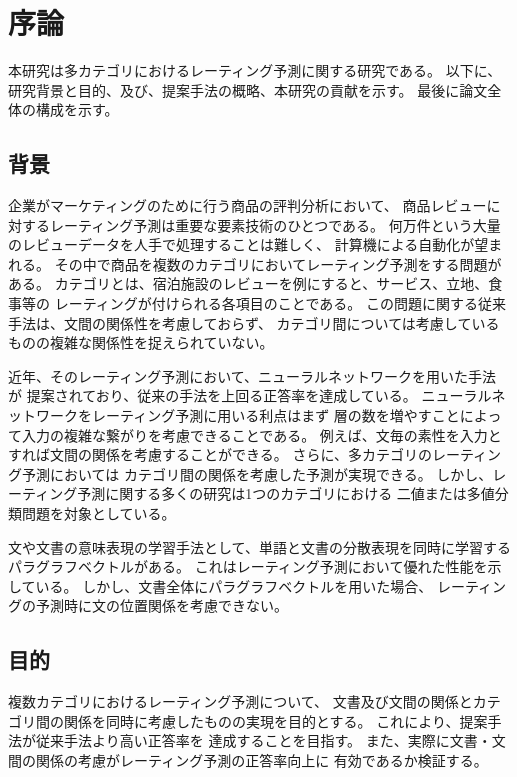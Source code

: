 \section{序論} \label{sec:Introduction}

本研究は多カテゴリにおけるレーティング予測に関する研究である。
以下に、研究背景と目的、及び、提案手法の概略、本研究の貢献を示す。
最後に論文全体の構成を示す。

\subsection{背景}

企業がマーケティングのために行う商品の評判分析において、
商品レビューに対するレーティング予測は重要な要素技術のひとつである。
何万件という大量のレビューデータを人手で処理することは難しく、
計算機による自動化が望まれる。
その中で商品を複数のカテゴリにおいてレーティング予測をする問題がある。
カテゴリとは、宿泊施設のレビューを例にすると、サービス、立地、食事等の
レーティングが付けられる各項目のことである。
この問題に関する従来手法\cite{fujitani15}は、文間の関係性を考慮しておらず、
カテゴリ間については考慮しているものの複雑な関係性を捉えられていない。

近年、そのレーティング予測において、ニューラルネットワークを用いた手法
\cite{nal14,rie14,duyu15}が
提案されており、従来の手法を上回る正答率を達成している。
ニューラルネットワークをレーティング予測に用いる利点はまず
層の数を増やすことによって入力の複雑な繋がりを考慮できることである。
例えば、文毎の素性を入力とすれば文間の関係を考慮することができる。
さらに、多カテゴリのレーティング予測においては
カテゴリ間の関係を考慮した予測が実現できる。
しかし、レーティング予測に関する多くの研究は1つのカテゴリにおける
二値または多値分類問題を対象としている。

文や文書の意味表現の学習手法として、単語と文書の分散表現を同時に学習する
パラグラフベクトル\cite{quoc14}がある。
これはレーティング予測において優れた性能を示している。
しかし、文書全体にパラグラフベクトルを用いた場合、
レーティングの予測時に文の位置関係を考慮できない。


\subsection{目的}

複数カテゴリにおけるレーティング予測について、
文書及び文間の関係とカテゴリ間の関係を同時に考慮したものの実現を目的とする。
これにより、提案手法が従来手法\cite{fujitani15}より高い正答率を
達成することを目指す。
また、実際に文書・文間の関係の考慮がレーティング予測の正答率向上に
有効であるか検証する。


